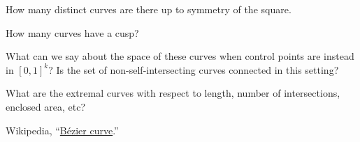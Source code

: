 \documentclass{article}
\begin{document}
\begin{related}
  \item How many distinct curves are there up to symmetry of the square.
  \item How many curves have a cusp?
  \item What can we say about the space of these curves when control points are instead in $[0,1]^k$? Is the set of non-self-intersecting curves connected in this setting?
  \item What are the extremal curves with respect to length, number of intersections, enclosed area, etc?
\end{related}
\begin{references}
  \item Wikipedia, ``\href{https://en.wikipedia.org/wiki/B%C3%A9zier_curve}{B\'ezier curve}.''
\end{references}
\end{document}
